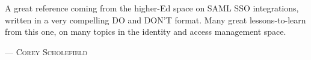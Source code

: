 A great reference coming from the higher-Ed space on SAML SSO integrations, written in a very compelling DO and DON'T format. Many great lessons-to-learn from this one, on many topics in the identity and access management space.
\setlength{\parindent}{0cm}\par\textsc{ --- Corey Scholefield }\par\vspace{12pt}\setlength{\parindent}{15pt}
